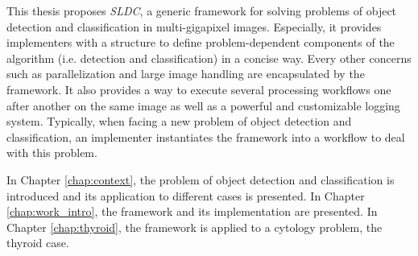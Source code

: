 This thesis proposes \textit{SLDC}, a generic framework for solving problems of object detection and classification in multi-gigapixel images. Especially, it provides implementers with a structure to define problem-dependent components of the algorithm (i.e. detection and classification) in a concise way. Every other concerns such as parallelization and large image handling are encapsulated by the framework. It also provides a way to execute several processing workflows one after another on the same image as well as a powerful and customizable logging system. Typically, when facing a new problem of object detection and classification, an implementer instantiates the framework into a workflow to deal with this problem. 

In Chapter \ref{chap:context}, the problem of object detection and classification is introduced and its application to different cases is presented. In Chapter \ref{chap:work_intro}, the framework and its implementation are presented. In Chapter \ref{chap:thyroid}, the framework is applied to a cytology problem, the thyroid case.
